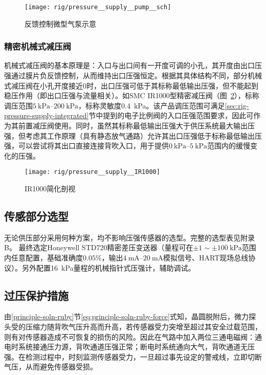 \begin{figure}[tbh]
\centering
\texttt{[image: rig/pressure\_\_supply\_\_pump\_\_sch]}
\caption{反馈控制微型气泵示意}
\label{fig:rig-pressure-supply-pump-sch}
\end{figure}

\subsubsection{精密机械式减压阀}\label{sec:rig-pressure-supply-reg}

机械式减压阀的基本原理是：入口与出口间有一开度可调的小孔，其开度由出口压强通过膜片负反馈控制，从而维持出口压强恒定。根据其具体结构不同，部分机械式减压阀在小孔开度接近0时，出口压强可低于其标称最低输出压强，但不能起到稳压作用（即出口压强与流量相关）。如SMC IR1000型精密减压阀（图~\ref{fig:rig-pressure-supply-ir1000}），标称调压范围$\SIrange{5}{200}{\kPa}$，标称灵敏度\SI{0.4}{\kPa}。该产品调压范围可满足\ref{sec:rig-pressure-supply-integrated}节中提到的电子比例阀的入口压强范围要求，因此可作为其前置减压阀使用。同时，虽然其标称最低输出压强大于供压系统最大输出压强，但考虑其工作原理（具有静态放气通路）允许其出口压强低于标称最低输出压强，可以尝试将其出口直接连接背吹入口，用于提供$\SIrange{0}{5}{\kPa}$范围内的缓慢变化的压强。

\begin{figure}[tbhp]
\centering
\texttt{[image: rig/pressure\_\_supply\_\_IR1000]}
\caption{IR1000简化剖视}
\label{fig:rig-pressure-supply-ir1000}
\end{figure}


\subsection{传感部分选型}\label{sec:rig-pressure-sensor}

无论供压部分采用何种方案，均不影响压强传感器的选型。完整的选型表见附录B。
最终选定Honeywell STD720精密差压变送器（量程可在$\pm \num{1} \sim \pm \SI{100}{\kPa}$范围内任意配置，基础准确度$0.05\%$，输出$\SIrange{4}{20}{\mA}$模拟信号、HART现场总线协议）。另外配置\SI{16}{\kPa}量程的机械指针式压强计，辅助调试。


\subsection{过压保护措施}\label{sec:rig-pressure-valve}

由\ref{principle-soln-ruby}节\eqref{eq:principle-soln-ruby-force}式知，晶圆脱附后，微力探头受的压缩力随背吹气压升高而升高，若传感器受力突增至超过其安全过载范围，则有对传感器造成不可恢复的损伤的风险。因此在气路中加入两位三通电磁阀：通电时系统接通压力源，背吹通道压强正常；断电时系统通向大气，背吹通道无压强。在检测过程中，时刻监测传感器受力，一旦超过事先设定的警戒线，立即切断气压，从而避免传感器受损。




